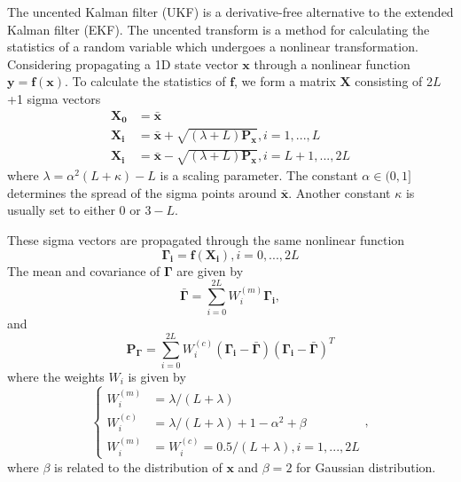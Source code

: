 \documentclass[12pt]{article}
\begin{document}
The uncented Kalman filter (UKF) is a derivative-free alternative to the extended Kalman filter (EKF). The uncented transform is a method for calculating the statistics of a random variable which undergoes a nonlinear transformation. Considering propagating a 1D state vector \(\mathbf{x}\) through a nonlinear function \(\mathbf{y} = \mathbf{f}(\mathbf{x})\). To calculate the statistics of \(\mathbf{f}\), we form a matrix \(\mathbf{X}\) consisting of 2$L$+1 sigma vectors \cite{Wan}
%
\begin{align} \label{eq:UK_start}
	\mathbf{X_0} &= \mathbf{\bar{x}} \\
	\mathbf{X_i} &= \mathbf{\bar{x}} + \sqrt{(\lambda + L)\mathbf{P_{x}}}, i=1,...,L \\
	\mathbf{X_i} &= \mathbf{\bar{x}} - \sqrt{(\lambda + L)\mathbf{P_{x}}}, i=L+1,...,2L
\end{align}
%
where \(\lambda = \alpha^{2}(L + \kappa) - L\) is a scaling parameter. The constant $\alpha \in (0, 1]$ determines the spread of the sigma points around \(\mathbf{\bar{x}}\). Another constant $\kappa$ is usually set to either 0 or $3 - L$.

These sigma vectors are propagated through the same nonlinear function
%
\begin{equation}
	\mathbf{\Gamma_i} = \mathbf{f}(\mathbf{X_i}), i = 0,...,2L
\end{equation}
%
The mean and covariance of \(\mathbf{\Gamma}\) are given by
%
\begin{equation}
	\mathbf{\bar{\Gamma}} = \sum_{i=0}^{2L} W^{(m)}_i \mathbf{\Gamma_i},
\end{equation}
%
and
\begin{equation}
	\mathbf{P_\Gamma} = \sum_{i=0}^{2L} W^{(c)}_i (\mathbf{\Gamma_i} - \mathbf{\bar{\Gamma}}) (\mathbf{\Gamma_i} - \mathbf{\bar{\Gamma}})^T
\end{equation}
%
where the weights $W_i$ is given by
%
\begin{equation} \label{eq:UK_end}
	\begin{cases}
		W^{(m)}_i &= \lambda / (L + \lambda) \\
		W^{(c)}_i &= \lambda / (L + \lambda) + 1 - \alpha^2 + \beta \\
		W_i^{(m)} &= W_i^{(c)} = 0.5/(L + \lambda), i=1,...,2L
	\end{cases}
	,
\end{equation}
%
where $\beta$ is related to the distribution of \(\mathbf{x}\) and $\beta=2$ for Gaussian distribution.
\end{document}
